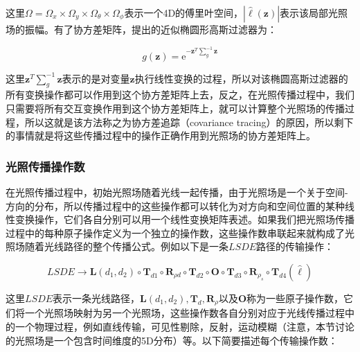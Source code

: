 \noindent 这里$\Omega=\Omega_x\times\Omega_y\times\Omega_\theta\times\Omega_\phi$表示一个4D的傅里叶空间，$|\hat{\ell}(\mathbf{z})|$表示该局部光照场的振幅。有了协方差矩阵，\cite{a:5DCovarianceTracingforEfficientDefocusandMotionBlur}提出的近似椭圆形高斯过滤器为：

\begin{equation}
	g(\mathbf{z})=\mathrm{e}^{-\mathbf{z}^{T}\sum^{-1}_g \mathbf{z}}
\end{equation}

\noindent 这里$\mathbf{z}^{T}\sum^{-1}_g \mathbf{z}$表示的是对变量$\mathbf{z}$执行线性变换的过程，所以对该椭圆高斯过滤器的所有变换操作都可以作用到这个协方差矩阵上去，反之，在光照传播过程中，我们只需要将所有交互变换作用到这个协方差矩阵上，就可以计算整个光照场的传播过程，所以这就是该方法称之为协方差追踪（covariance tracing）的原因，所以剩下的事情就是将这些传播过程中的操作正确作用到光照场的协方差矩阵上。





\subsubsection{光照传播操作数}
在光照传播过程中，初始光照场随着光线一起传播，由于光照场是一个关于空间-方向的分布，所以传播过程中的这些操作都可以转化为对方向和空间位置的某种线性变换操作，它们各自分别可以用一个线性变换矩阵表述。如果我们把光照场传播过程中的每种原子操作定义为一个独立的操作数，这些操作数串联起来就构成了光照场随着光线路径的整个传播公式。例如以下是一条$LSDE$路径的传输操作：

\begin{equation}
	LSDE\to\mathbf{L}(d_1,d_2)\circ\mathbf{T}_{d1}\circ\mathbf{R}_{\rho d}\circ\mathbf{T}_{d2}\circ\mathbf{O}\circ\mathbf{T}_{d3}\circ\mathbf{R}_{\rho_s}\circ\mathbf{T}_{d4}(\hat{\ell})
\end{equation}

这里$LSDE$表示一条光线路径，$\mathbf{L}(d_1,d_2), \mathbf{T}_d, \mathbf{R}_\rho$以及$\mathbf{O}$称为一些原子操作数，它们将一个光照场映射为另一个光照场，这些操作数各自分别对应于光线传播过程中的一个物理过程，例如直线传输，可见性剔除，反射，运动模糊（注意，本节讨论的光照场是一个包含时间维度的5D分布）等。以下简要描述每个传输操作数：

